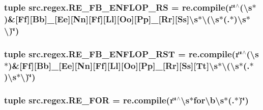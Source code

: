 \hypertarget{namespacesrc_1_1regex_a7307406c527905e22123341888830f60}{
\subsubsection[{R\-E\-\_\-\-F\-B\-\_\-\-E\-N\-F\-L\-O\-P\-\_\-\-R\-S}]{\setlength{\rightskip}{0pt plus 5cm}tuple src.\-regex.\-R\-E\-\_\-\-F\-B\-\_\-\-E\-N\-F\-L\-O\-P\-\_\-\-R\-S = re.\-compile(r\char`\"{}$^\wedge$(\textbackslash{}s$\ast$)\&\mbox{[}Ff\mbox{]}\mbox{[}Bb\mbox{]}\-\_\-\mbox{[}Ee\mbox{]}\mbox{[}Nn\mbox{]}\mbox{[}Ff\mbox{]}\mbox{[}Ll\mbox{]}\mbox{[}Oo\mbox{]}\mbox{[}Pp\mbox{]}\-\_\-\mbox{[}Rr\mbox{]}\mbox{[}Ss\mbox{]}\textbackslash{}s$\ast$\textbackslash{}(\textbackslash{}s$\ast$(.$\ast$)\textbackslash{}s$\ast$\textbackslash{})\char`\"{})}}\label{namespacesrc_1_1regex_a7307406c527905e22123341888830f60}
\hypertarget{namespacesrc_1_1regex_ae494ff9c23fd3edb9fef46d6e80f9ed9}{
\subsubsection[{R\-E\-\_\-\-F\-B\-\_\-\-E\-N\-F\-L\-O\-P\-\_\-\-R\-S\-T}]{\setlength{\rightskip}{0pt plus 5cm}tuple src.\-regex.\-R\-E\-\_\-\-F\-B\-\_\-\-E\-N\-F\-L\-O\-P\-\_\-\-R\-S\-T = re.\-compile(r\char`\"{}$^\wedge$(\textbackslash{}s$\ast$)\&\mbox{[}Ff\mbox{]}\mbox{[}Bb\mbox{]}\-\_\-\mbox{[}Ee\mbox{]}\mbox{[}Nn\mbox{]}\mbox{[}Ff\mbox{]}\mbox{[}Ll\mbox{]}\mbox{[}Oo\mbox{]}\mbox{[}Pp\mbox{]}\-\_\-\mbox{[}Rr\mbox{]}\mbox{[}Ss\mbox{]}\mbox{[}Tt\mbox{]}\textbackslash{}s$\ast$\textbackslash{}(\textbackslash{}s$\ast$(.$\ast$)\textbackslash{}s$\ast$\textbackslash{})\char`\"{})}}\label{namespacesrc_1_1regex_ae494ff9c23fd3edb9fef46d6e80f9ed9}
\hypertarget{namespacesrc_1_1regex_ac7955a5195cf4962ca8528da746bd5d7}{
\subsubsection[{R\-E\-\_\-\-F\-O\-R}]{\setlength{\rightskip}{0pt plus 5cm}tuple src.\-regex.\-R\-E\-\_\-\-F\-O\-R = re.\-compile(r\char`\"{}$^\wedge$\textbackslash{}s$\ast$for\textbackslash{}b\textbackslash{}s$\ast$(.$\ast$)\char`\"{})}}\label{namespacesrc_1_1regex_ac7955a5195cf4962ca8528da746bd5d7}
